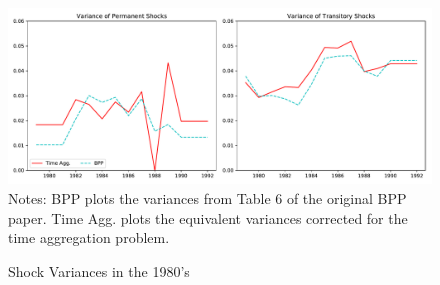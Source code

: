 \documentclass[titlepage]{\econtex}\newcommand{\texname}{BPP_PSID_TimeAgg}
\begin{document}
\begin{figure}
	\caption{Shock Variances in the 1980's}
	\label{shockVariance}
	\includegraphics[width=1\textwidth]{Code/Figures/ShockVariances1980s.pdf}
	\footnotesize Notes: BPP plots the variances from Table 6 of the original BPP paper. Time Agg. plots the equivalent variances corrected for the time aggregation problem.
\end{figure}

\processdelayedfloats


%

\pagebreak\appendix

\end{document}
